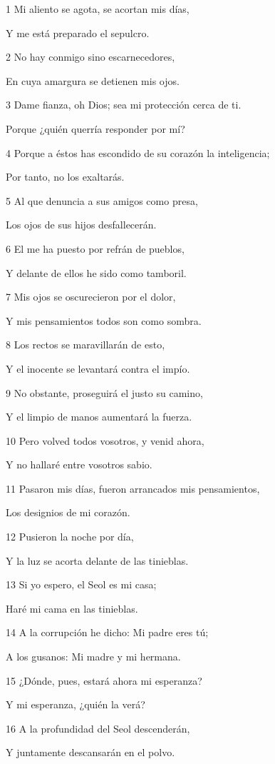 \par 1 Mi aliento se agota, se acortan mis días,
\par Y me está preparado el sepulcro.
\par 2 No hay conmigo sino escarnecedores,
\par En cuya amargura se detienen mis ojos.
\par 3 Dame fianza, oh Dios; sea mi protección cerca de ti.
\par Porque ¿quién querría responder por mí?
\par 4 Porque a éstos has escondido de su corazón la inteligencia;
\par Por tanto, no los exaltarás.
\par 5 Al que denuncia a sus amigos como presa,
\par Los ojos de sus hijos desfallecerán.
\par 6 El me ha puesto por refrán de pueblos,
\par Y delante de ellos he sido como tamboril.
\par 7 Mis ojos se oscurecieron por el dolor,
\par Y mis pensamientos todos son como sombra.
\par 8 Los rectos se maravillarán de esto,
\par Y el inocente se levantará contra el impío.
\par 9 No obstante, proseguirá el justo su camino,
\par Y el limpio de manos aumentará la fuerza.
\par 10 Pero volved todos vosotros, y venid ahora,
\par Y no hallaré entre vosotros sabio.
\par 11 Pasaron mis días, fueron arrancados mis pensamientos,
\par Los designios de mi corazón.
\par 12 Pusieron la noche por día,
\par Y la luz se acorta delante de las tinieblas.
\par 13 Si yo espero, el Seol es mi casa;
\par Haré mi cama en las tinieblas.
\par 14 A la corrupción he dicho: Mi padre eres tú;
\par A los gusanos: Mi madre y mi hermana.
\par 15 ¿Dónde, pues, estará ahora mi esperanza?
\par Y mi esperanza, ¿quién la verá?
\par 16 A la profundidad del Seol descenderán,
\par Y juntamente descansarán en el polvo. 


